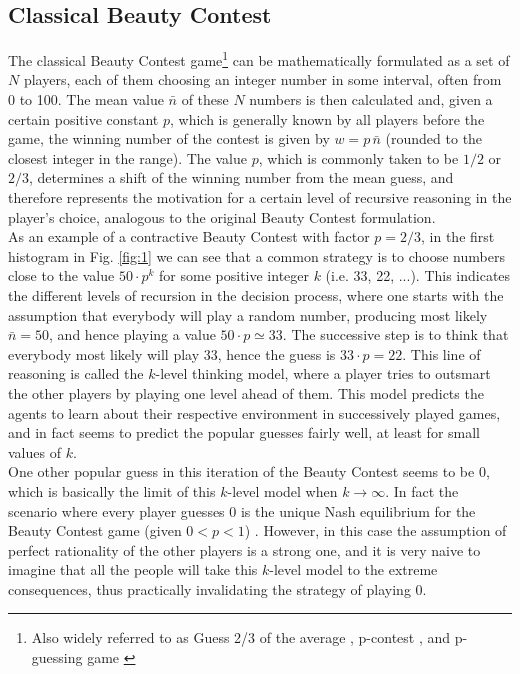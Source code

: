 \subsection{Classical Beauty Contest}

The classical Beauty Contest game\footnote{Also widely referred to as Guess 2/3 of the average \citep{ledoux1981concours}, p-contest \citep{kennerberg2019convergence}, and p-guessing game \citep{vie2021evolutionary}} can be mathematically formulated as a set of $N$ players, each of them choosing an integer number in some interval, often from 0 to 100. The mean value $\bar{n}$ of these $N$ numbers is then calculated and, given a certain positive constant $p$, which is generally known by all players before the game, the winning number of the contest is given by $w=p\,\bar{n}$ (rounded to the closest integer in the range). The value $p$, which is commonly taken to be $1/2$ or $2/3$, determines a shift of the winning number from the mean guess, and therefore represents the motivation for a certain level of recursive reasoning in the player's choice, analogous to the original Beauty Contest formulation.\\

As an example of a contractive Beauty Contest with factor $p=2/3$, in the first histogram in Fig. \ref{fig:1} we can see that a common strategy is to choose numbers close to the value $50\cdot p^k$ for some positive integer $k$ (i.e. 33, 22, ...). This indicates the different levels of recursion in the decision process, where one starts with the assumption that everybody will play a random number, producing most likely $\bar{n}=50$, and hence playing a value $50\cdot p\simeq 33$. The successive step is to think that everybody most likely will play $33$, hence the guess is  $33\cdot p=22$. This line of reasoning is called the $k$-level thinking model, where a player tries to outsmart the other players by playing one level ahead of them. This model predicts the agents to learn about their respective environment in successively played games, and in fact seems to predict the popular guesses fairly well, at least for small values of $k$.\\

One other popular guess in this iteration of the Beauty Contest seems to be 0, which is basically the limit of this $k$-level model when $k\to\infty$. In fact the scenario where every player guesses 0 is the unique Nash equilibrium for the Beauty Contest game (given $0< p<1$) \citep{kennerberg2019convergence}. However, in this case the assumption of perfect rationality of the other players is a strong one, and it is very naive to imagine that all the people will take this $k$-level model to the extreme consequences, thus practically invalidating the strategy of playing 0.\\


